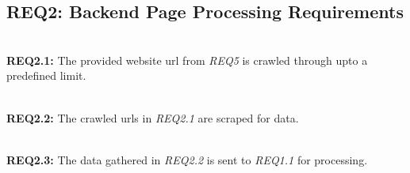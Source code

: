 \subsection{REQ2: Backend Page Processing Requirements}


\textbf{\\REQ2.1:} The provided website url from \textit{REQ5} is crawled  through upto a predefined limit.\par

\textbf{\\REQ2.2:} The crawled urls in \textit{REQ2.1} are scraped for data.\par

\textbf{\\REQ2.3:} The data gathered in \textit{REQ2.2} is sent to \textit{REQ1.1} for processing.\par


